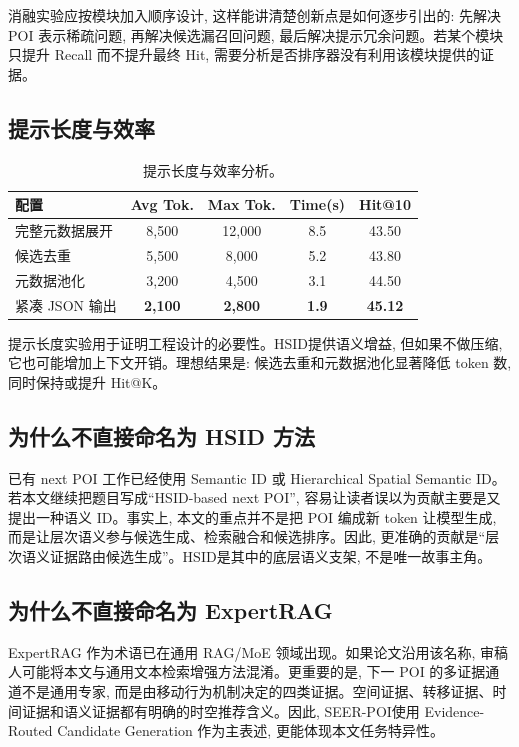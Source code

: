 \documentclass[10pt,twocolumn,fontset=none]{ctexart}
\newcommand{\method}{SEER-POI}
\newcommand{\hsid}{HSID}
\begin{document}
消融实验应按模块加入顺序设计, 这样能讲清楚创新点是如何逐步引出的: 先解决 POI 表示稀疏问题, 再解决候选漏召回问题, 最后解决提示冗余问题。若某个模块只提升 Recall 而不提升最终 Hit, 需要分析是否排序器没有利用该模块提供的证据。

\subsection{提示长度与效率}
\begin{table}[t]
\centering
\caption{提示长度与效率分析。}
\label{tab:efficiency}
\small
\begin{tabular}{lcccc}
\toprule
配置 & Avg Tok. & Max Tok. & Time(s) & Hit@10 \\
\midrule
完整元数据展开 & 8,500 & 12,000 & 8.5 & 43.50 \\
候选去重 & 5,500 & 8,000 & 5.2 & 43.80 \\
元数据池化 & 3,200 & 4,500 & 3.1 & 44.50 \\
紧凑 JSON 输出 & \textbf{2,100} & \textbf{2,800} & \textbf{1.9} & \textbf{45.12} \\
\bottomrule
\end{tabular}
\end{table}

提示长度实验用于证明工程设计的必要性。\hsid 提供语义增益, 但如果不做压缩, 它也可能增加上下文开销。理想结果是: 候选去重和元数据池化显著降低 token 数, 同时保持或提升 Hit@K。



\subsection{为什么不直接命名为 HSID 方法}
已有 next POI 工作已经使用 Semantic ID 或 Hierarchical Spatial Semantic ID。若本文继续把题目写成“HSID-based next POI”, 容易让读者误以为贡献主要是又提出一种语义 ID。事实上, 本文的重点并不是把 POI 编成新 token 让模型生成, 而是让层次语义参与候选生成、检索融合和候选排序。因此, 更准确的贡献是“层次语义证据路由候选生成”。\hsid 是其中的底层语义支架, 不是唯一故事主角。

\subsection{为什么不直接命名为 ExpertRAG}
ExpertRAG 作为术语已在通用 RAG/MoE 领域出现。如果论文沿用该名称, 审稿人可能将本文与通用文本检索增强方法混淆。更重要的是, 下一 POI 的多证据通道不是通用专家, 而是由移动行为机制决定的四类证据。空间证据、转移证据、时间证据和语义证据都有明确的时空推荐含义。因此, \method 使用 Evidence-Routed Candidate Generation 作为主表述, 更能体现本文任务特异性。
\end{document}
